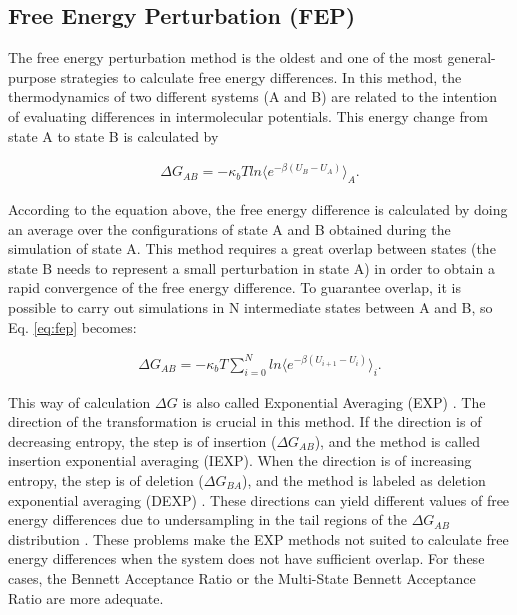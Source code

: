 \subsection{Free Energy Perturbation (FEP)}
The free energy perturbation method \cite{zwanzig1954} is the oldest and one of the most general-purpose strategies to calculate free energy differences. In this method, the thermodynamics of two different systems (A and B) are related to the intention of evaluating differences in intermolecular potentials. This energy change from state A to state B is calculated by  

\begin{equation}
\label{eq:fep}
\begin{aligned}
\Delta G_{AB} = -\kappa_{b}T ln \langle{e^{-\beta (U_{B}-U_{A})}}\rangle_{A} .
\end{aligned}
\end{equation}

According to the equation above, the free energy difference is calculated by doing an average over the configurations of state A and B obtained during the simulation of state A. This method requires a great overlap between states (the state B needs to represent a small perturbation in state A) in order to obtain a rapid convergence of the free energy difference. To guarantee overlap, it is possible to carry out simulations in N intermediate states between A and B, so Eq. \eqref{eq:fep} becomes:

\begin{equation}
\label{eq:fepint}
\begin{aligned}
\Delta G_{AB} = -\kappa_{b}T  \sum_{i=0}^{N}
ln \langle {e^{-\beta (U_{i+1}-U_{i})}} \rangle_{i} .
\end{aligned}
\end{equation}

This way of calculation $\Delta G$ is also called Exponential Averaging (EXP) \cite{zwanzig1955,bareva}. The direction of the transformation is crucial in this method. If the direction is of decreasing entropy, the step is of insertion ($\Delta G_{AB}$), and the method is called insertion exponential averaging (IEXP). When the direction is of increasing entropy, the step is of deletion ($\Delta G_{BA}$), and the method is labeled as deletion exponential averaging (DEXP) \cite{bareva}. These directions can yield different values of free energy differences due to undersampling in the tail regions of the $\Delta G_{AB}$ distribution \cite{klimovich,pohorille2010}. These problems make the EXP methods not suited to calculate free energy differences when the system does not have sufficient overlap. For these cases, the Bennett Acceptance Ratio or the Multi-State Bennett Acceptance Ratio are more adequate.   

